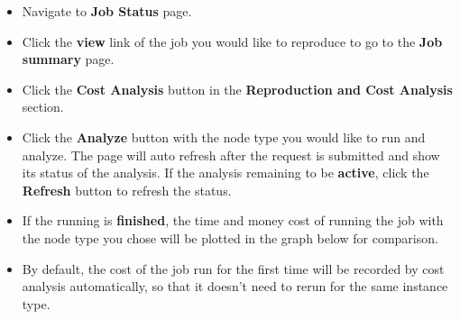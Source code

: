 \begin{itemize}
\item Navigate to \textbf{Job Status} page.%
\item Click the \textbf{view} link of the job you would like to reproduce to go to the \textbf{Job summary} page.
\item Click the \textbf{Cost Analysis} button in the \textbf{Reproduction and Cost Analysis} section.
\item Click the \textbf{Analyze} button with the node type you would like to run and analyze. The page will auto refresh after the request is submitted and show its status of the analysis. If the analysis remaining to be \textbf{active}, click the \textbf{Refresh} button to refresh the status.
\item If the running is \textbf{finished}, the time and money cost of running the job with the node type you chose will be plotted in the graph below for comparison.
\item By default, the cost of the job run for the first time will be recorded by cost analysis automatically, so that it doesn't need to rerun for the same instance type.
\end{itemize}

